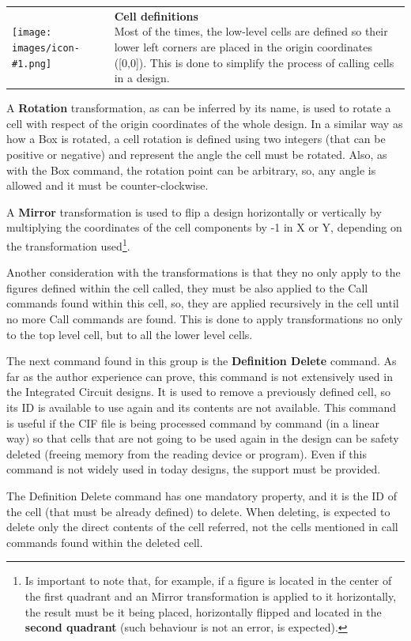 \documentclass[11pt,twoside,openany,x11names,svgnames]{memoir}
\makeatletter
\newcommand{\IconNote}[3]
{
	\begin{table}[ht]
	\begin{tabular}{ lm{\dimexpr\textwidth-8\tabcolsep-\wd0}@{}}
		\toprule
		\texttt{[image: images/icon-\#1.png]}
		&
		\parbox[t]{155mm}{
		\textbf{#2} \\
		#3
		}
	\end{tabular}
\end{table}
}
\makeatother
\begin{document}
\IconNote
	{info}
	{Cell definitions}
	{Most of the times, the low-level cells are defined so their lower left corners are placed in the origin coordinates ([0,0]). This is done to simplify the process of calling cells in a design.}
	
A \textbf{Rotation} transformation, as can be inferred by its name, is used to rotate a cell with respect of the origin coordinates of the whole design. In a similar way as how a Box is rotated, a cell rotation is defined using two integers (that can be positive or negative) and represent the angle the cell must be rotated. Also, as with the Box command, the rotation point can be arbitrary, so, any angle is allowed and it must be counter-clockwise.

A \textbf{Mirror} transformation is used to flip a design horizontally or vertically by multiplying the coordinates of the cell components by -1 in X or Y, depending on the transformation used\footnote{Is important to note that, for example, if a figure is located in the center of the first quadrant and an Mirror transformation is applied to it horizontally, the result must be it being placed, horizontally flipped and located in the \textbf{second quadrant} (such behaviour is not an error, is expected).}.

Another consideration with the transformations is that they no only apply to the figures defined within the cell called, they must be also applied to the Call commands found within this cell, so, they are applied recursively in the cell until no more Call commands are found. This is done to apply transformations no only to the top level cell, but to all the lower level cells.

The next command found in this group is the \textbf{Definition Delete} command. As far as the author experience can prove, this command is not extensively used in the Integrated Circuit designs. It is used to remove a previously defined cell, so its ID is available to use again and its contents are not available. This command is useful if the CIF file is being processed command by command (in a linear way) so that cells that are not going to be used again in the design can be safety deleted (freeing memory from the reading device or program). Even if this command is not widely used in today designs, the support must be provided.

The Definition Delete command has one mandatory property, and it is the ID of the cell (that must be already defined) to delete. When deleting, is expected to delete only the direct contents of the cell referred, not the cells mentioned in call commands found within the deleted cell.
\end{document}
